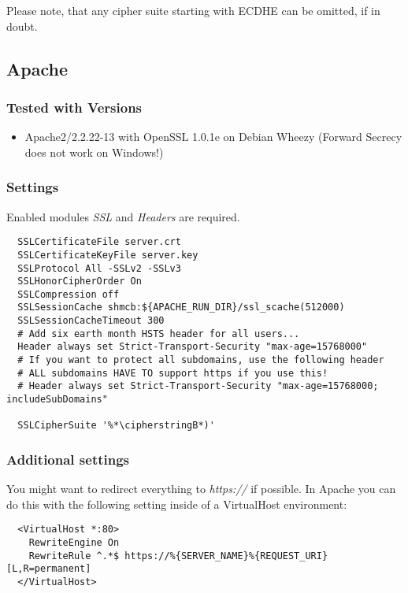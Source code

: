 Please note, that any cipher suite starting with ECDHE can be omitted, if in doubt.

\subsection{Apache}


\subsubsection{Tested with Versions}
\begin{itemize}
  \item Apache2/2.2.22-13 with OpenSSL 1.0.1e on Debian Wheezy (Forward Secrecy does not work on Windows!)
\end{itemize}


\subsubsection{Settings}
Enabled modules \emph{SSL} and \emph{Headers} are required.

\begin{lstlisting}
  SSLCertificateFile server.crt
  SSLCertificateKeyFile server.key
  SSLProtocol All -SSLv2 -SSLv3 
  SSLHonorCipherOrder On
  SSLCompression off
  SSLSessionCache shmcb:${APACHE_RUN_DIR}/ssl_scache(512000)
  SSLSessionCacheTimeout 300
  # Add six earth month HSTS header for all users...
  Header always set Strict-Transport-Security "max-age=15768000"
  # If you want to protect all subdomains, use the following header
  # ALL subdomains HAVE TO support https if you use this!
  # Header always set Strict-Transport-Security "max-age=15768000; includeSubDomains"

  SSLCipherSuite '%*\cipherstringB*)'
\end{lstlisting}


\subsubsection{Additional settings}
You might want to redirect everything to \emph{https://} if possible. In Apache
you can do this with the following setting inside of a VirtualHost environment:

\begin{lstlisting}
  <VirtualHost *:80>
    RewriteEngine On
    RewriteRule ^.*$ https://%{SERVER_NAME}%{REQUEST_URI} [L,R=permanent]
  </VirtualHost>
\end{lstlisting}

